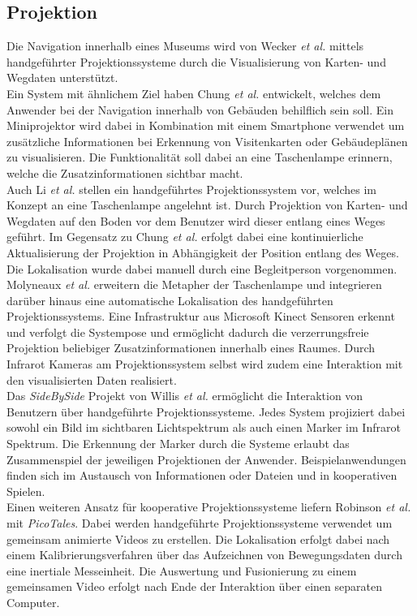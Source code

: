 \subsection{Projektion}
Die Navigation innerhalb eines Museums wird von Wecker \textit{et al.} \cite{Wecker2013} mittels handgeführter Projektionssysteme durch die Visualisierung von Karten- und Wegdaten unterstützt.\\
Ein System mit ähnlichem Ziel haben Chung \textit{et al.} \cite{Chung2011} entwickelt, welches dem Anwender bei der Navigation innerhalb von Gebäuden behilflich sein soll. Ein Miniprojektor wird dabei in Kombination mit einem Smartphone verwendet um zusätzliche Informationen bei Erkennung von Visitenkarten oder Gebäudeplänen zu visualisieren. Die Funktionalität soll dabei an eine Taschenlampe erinnern, welche die Zusatzinformationen sichtbar macht.\\
Auch Li \textit{et al.} \cite{Li2013} stellen ein handgeführtes Projektionssystem vor, welches im Konzept an eine Taschenlampe angelehnt ist. Durch Projektion von Karten- und Wegdaten auf den Boden vor dem Benutzer wird dieser entlang eines Weges geführt. Im Gegensatz zu Chung \textit{et al.} erfolgt dabei eine kontinuierliche Aktualisierung der Projektion in Abhängigkeit der Position entlang des Weges. Die Lokalisation wurde dabei manuell durch eine Begleitperson vorgenommen.\\
Molyneaux \textit{et al.} \cite{Molyneaux2012} erweitern die Metapher der Taschenlampe und integrieren darüber hinaus eine automatische Lokalisation des handgeführten Projektionssystems. Eine Infrastruktur aus Microsoft Kinect Sensoren erkennt und verfolgt die Systempose und ermöglicht dadurch die verzerrungsfreie Projektion beliebiger Zusatzinformationen innerhalb eines Raumes. Durch Infrarot Kameras am Projektionssystem selbst wird zudem eine Interaktion mit den visualisierten Daten realisiert.\\
Das \textit{SideBySide} Projekt von Willis \textit{et al.} \cite{Willis2011} ermöglicht die Interaktion von Benutzern über handgeführte Projektionssysteme. Jedes System projiziert dabei sowohl ein Bild im sichtbaren Lichtspektrum als auch einen Marker im Infrarot Spektrum. Die Erkennung der Marker durch die Systeme erlaubt das Zusammenspiel der jeweiligen Projektionen der Anwender. Beispielanwendungen finden sich im Austausch von Informationen oder Dateien und in kooperativen Spielen.\\
Einen weiteren Ansatz für kooperative Projektionssysteme liefern Robinson \textit{et al.} \cite{Robinson2012} mit \textit{PicoTales}. Dabei werden handgeführte Projektionssysteme verwendet um gemeinsam animierte Videos zu erstellen. Die Lokalisation erfolgt dabei nach einem Kalibrierungsverfahren über das Aufzeichnen von Bewegungsdaten durch eine inertiale Messeinheit. Die Auswertung und Fusionierung zu einem gemeinsamen Video erfolgt nach Ende der Interaktion über einen separaten Computer.\\
\red[Omnitouch]

